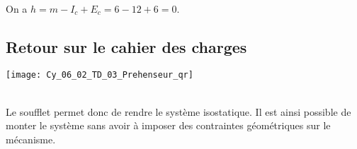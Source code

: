 \ifprof
\begin{corrige} ~\\
On a $h=m-I_c+E_c = 6-12+6 = 0$.
\end{corrige}
\else
\fi

\ifprof
\else
{}
\fi

\subsection*{Retour sur le cahier des charges}


\ifprof
\else
\begin{marginfigure}
\centering
\texttt{[image: Cy\_06\_02\_TD\_03\_Prehenseur\_qr]}
\end{marginfigure}
\fi

\ifprof
\begin{corrige} ~\\
Le soufflet permet donc de rendre le système isostatique. Il est ainsi possible de monter le système sans avoir à imposer des contraintes géométriques sur le mécanisme. 
\end{corrige}
\else
\fi


